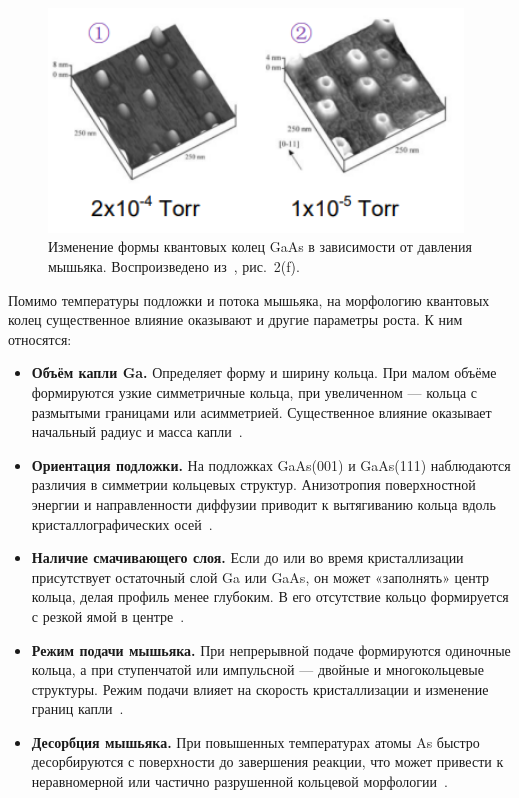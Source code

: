\documentclass[14pt,oneside]{extarticle}
\begin{document}
\begin{figure}[H]
    \begin{center}
        \includegraphics[width=11cm]{images/fanma_fig2e_right.png}
        \caption{\label{fig:fanma_pressure}
            Изменение формы квантовых колец GaAs в зависимости от давления мышьяка. Воспроизведено из~\cite{fan2023}, рис.~2(f).}
    \end{center}
\end{figure}

Помимо температуры подложки и потока мышьяка, на морфологию квантовых колец существенное влияние оказывают и другие параметры роста. К ним относятся:

\begin{itemize}
    \item \textbf{Объём капли Ga.} Определяет форму и ширину кольца. При малом объёме формируются узкие симметричные кольца, при увеличенном — кольца с размытыми границами или асимметрией. Существенное влияние оказывает начальный радиус и масса капли~\cite{zhou2013}.

    \item \textbf{Ориентация подложки.} На подложках GaAs(001) и GaAs(111) наблюдаются различия в симметрии кольцевых структур. Анизотропия поверхностной энергии и направленности диффузии приводит к вытягиванию кольца вдоль кристаллографических осей~\cite{elborg2017}.

    \item \textbf{Наличие смачивающего слоя.} Если до или во время кристаллизации присутствует остаточный слой Ga или GaAs, он может «заполнять» центр кольца, делая профиль менее глубоким. В его отсутствие кольцо формируется с резкой ямой в центре~\cite{sibirmovskiy2014}.

    \item \textbf{Режим подачи мышьяка.} При непрерывной подаче формируются одиночные кольца, а при ступенчатой или импульсной — двойные и многокольцевые структуры. Режим подачи влияет на скорость кристаллизации и изменение границ капли~\cite{wang2022}.

    \item \textbf{Десорбция мышьяка.} При повышенных температурах атомы As быстро десорбируются с поверхности до завершения реакции, что может привести к неравномерной или частично разрушенной кольцевой морфологии~\cite{fan2023}.
\end{itemize}
\end{document}
